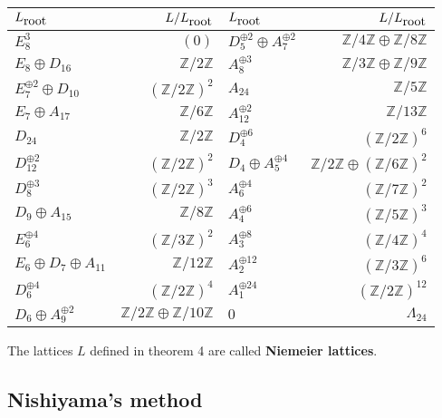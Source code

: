 \documentclass{amsart}
\begin{document}
\begin{center}
\begin{tabular}{|l|r|l|r|}
\hline

$L_{\hbox{root}}$ & $L/L_{\hbox{root}}$ & $L_{\hbox{root}}$ & $L/L_{\hbox{root}}$ \\ \hline
  $E_8^3$    &  $(0)$ & $D_5^{\oplus 2}\oplus A_7^{\oplus 2} $& $\mathbb Z/4\mathbb Z \oplus \mathbb Z /8 \mathbb Z$\\ \hline
$E_8\oplus D_{16}$ & $\mathbb Z /2 \mathbb Z $ & $A_8^{\oplus 3}$ & $\mathbb Z/3\mathbb Z \oplus \mathbb Z / 9 \mathbb Z$ \\ \hline
$E_7^{\oplus 2}\oplus D_{10}$ & $(\mathbb Z/2 \mathbb Z)^2$ & $A_{24}$ & $\mathbb Z/5 \mathbb Z $\\\hline 
$E_7 \oplus A_{17}$ & $\mathbb Z /6 \mathbb Z$ & $A_{12}^{\oplus 2}$ & $\mathbb Z /13 \mathbb Z$\\ \hline
$D_{24}$ & $\mathbb Z /2 \mathbb Z $ & $D_4^{\oplus 6}$ & $(\mathbb Z /2 \mathbb Z)^6$ \\ \hline
$D_{12}^{\oplus 2}$ & $(\mathbb Z /2 \mathbb Z)^2$ & $D_4 \oplus A_5^{\oplus 4}$ & $\mathbb Z /2 \mathbb Z \oplus ( \mathbb Z /6 \mathbb Z )^2$ \\ \hline
$D_8^{\oplus 3 }$ & $(\mathbb Z /2 \mathbb Z)^3$ & $A_6^{\oplus 4}$ & $(\mathbb Z /7 \mathbb Z )^2$ \\ \hline
$D_9 \oplus A_{15} $ & $\mathbb Z /8 \mathbb Z $ & $A_4^{\oplus 6}$ & $(\mathbb Z / 5 \mathbb Z)^3$\\ \hline
$E_6^{\oplus 4}$ &  $(\mathbb Z /3 \mathbb Z)^2$ & $A_3^{\oplus 8}$ & $(\mathbb Z /4 \mathbb Z)^4$ \\ \hline

$E_6 \oplus D_7 \oplus A_{11}$ & $\mathbb Z /12 \mathbb Z $ & $A_2^{\oplus 12}$ & $(\mathbb Z /3 \mathbb Z)^6 $ \\ \hline
$D_6^{\oplus 4}$ & $(\mathbb Z /2 \mathbb Z)^4$ & $A_1^{\oplus 24}$ & $(\mathbb Z /2 \mathbb Z)^{12}$\\ \hline
$D_6 \oplus A_9^{\oplus 2}$ & $\mathbb Z /2 \mathbb Z \oplus \mathbb Z /10 \mathbb Z $ & $0$ & $\Lambda _{24}$\\


\hline
\end{tabular}
\end{center}

The lattices $L$ defined in theorem 4 are called {\bf{Niemeier lattices}}.



\subsection{Nishiyama's method}
\end{document}
